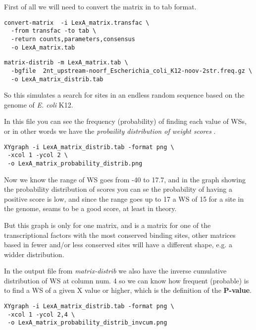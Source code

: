 First of all we will need to convert the matrix in to tab format. 

{\color{Blue} \begin{footnotesize} 
\begin{verbatim}
convert-matrix  -i LexA_matrix.transfac \
  -from transfac -to tab \
  -return counts,parameters,consensus 
  -o LexA_matrix.tab
\end{verbatim} \end{footnotesize}}


{\color{Blue} \begin{footnotesize}
\begin{verbatim}
matrix-distrib -m LexA_matrix.tab \
  -bgfile  2nt_upstream-noorf_Escherichia_coli_K12-noov-2str.freq.gz \
  -o LexA_matrix_distrib.tab
\end{verbatim} \end{footnotesize} }

So this simulates a search for sites in an endless random sequence
based on the genome of \textit{E. coli} K12.

In this file you can see the frequency (probability) of finding each
value of WSs, or in other words we have the \textit{ probaility
distribution of weight scores }.
{\color{Blue} \begin{footnotesize}
\begin{verbatim}
XYgraph -i LexA_matrix_distrib.tab -format png \
 -xcol 1 -ycol 2 \
 -o LexA_matrix_probability_distrib.png
\end{verbatim} \end{footnotesize} }

Now we know the range of WS goes from -40 to 17.7, and in the graph
showing the probability distribution of scores you can se the
probability of having a positive score is low, and since the range
goes up to 17 a WS of 15 for a site in the genome, seams to be a good
score, at least in theory.

But this graph is only for one matrix, and is a matrix for one of the
transcriptional factors with the most conserved binding sites, other
matrices based in fewer and/or less conserved sites will have a
different shape, e.g. a widder distribution.

In the output file from \textit{matrix-distrib} we also have the
inverse cumulative distribution of WS at column num. 4 so we can know how frequent
(probable) is to find a WS of a given X value or higher, which is the
definition of the \textbf{P-value}.

{\color{Blue} \begin{footnotesize}
\begin{verbatim}
XYgraph -i LexA_matrix_distrib.tab -format png \
 -xcol 1 -ycol 2,4 \
 -o LexA_matrix_probability_distrib_invcum.png
\end{verbatim} \end{footnotesize} }

